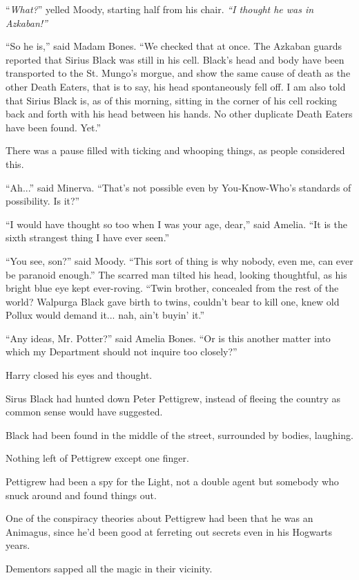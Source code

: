 ``\emph{What?}'' yelled Moody, starting half from his chair. \emph{``I thought he was in Azkaban!''}

``So he is,'' said Madam Bones. ``We checked that at once. The Azkaban guards reported that Sirius Black was still in his cell. Black's head and body have been transported to the St. Mungo's morgue, and show the same cause of death as the other Death Eaters, that is to say, his head spontaneously fell off. I am also told that Sirius Black is, as of this morning, sitting in the corner of his cell rocking back and forth with his head between his hands. No other duplicate Death Eaters have been found. Yet.''

There was a pause filled with ticking and whooping things, as people considered this.

``Ah...'' said Minerva. ``That's not possible even by You-Know-Who's standards of possibility. Is it?''

``I would have thought so too when I was your age, dear,'' said Amelia. ``It is the sixth strangest thing I have ever seen.''

``You see, son?'' said Moody. ``This sort of thing is why nobody, even me, can ever be paranoid enough.'' The scarred man tilted his head, looking thoughtful, as his bright blue eye kept ever-roving. ``Twin brother, concealed from the rest of the world? Walpurga Black gave birth to twins, couldn't bear to kill one, knew old Pollux would demand it... nah, ain't buyin' it.''

``Any ideas, Mr. Potter?'' said Amelia Bones. ``Or is this another matter into which my Department should not inquire too closely?''

Harry closed his eyes and thought.

Sirus Black had hunted down Peter Pettigrew, instead of fleeing the country as common sense would have suggested.

Black had been found in the middle of the street, surrounded by bodies, laughing.

Nothing left of Pettigrew except one finger.

Pettigrew had been a spy for the Light, not a double agent but somebody who snuck around and found things out.

One of the conspiracy theories about Pettigrew had been that he was an Animagus, since he'd been good at ferreting out secrets even in his Hogwarts years.

Dementors sapped all the magic in their vicinity.

